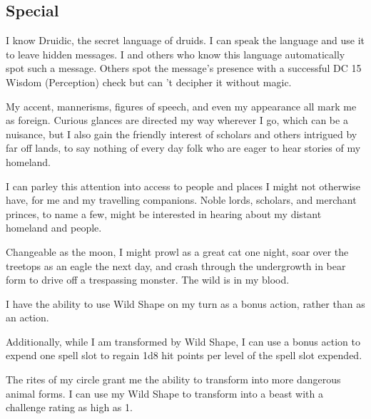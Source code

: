 \documentclass[letterpaper,10pt,twoside,twocolumn,openany]{book}
\begin{document}
\subsection{Special}
\begin{specialability}[Druidic]
  I know Druidic, the secret language of druids. I can speak the language and use it to leave hidden messages. I and others who know this language automatically spot such a message. Others spot the message’s presence with a successful DC 15 Wisdom (Perception) check but can ’t decipher it without magic.
\end{specialability}

\begin{specialability}
  My accent, mannerisms, figures of speech, and even my appearance all mark me as foreign. Curious glances are directed my way wherever I go, which can be a nuisance, but I also gain the friendly interest of scholars and others intrigued by far off lands, to say nothing of every day folk who are eager to hear stories of my homeland.

  I can parley this attention into access to people and places I might not otherwise have, for me and my travelling companions. Noble lords, scholars, and merchant princes, to name a few, might be interested in hearing about my distant homeland and people.
\end{specialability}

\begin{specialability}
  Changeable as the moon, I might prowl as a great cat one night, soar over the treetops as an eagle the next day, and crash through the undergrowth
  in bear form to drive off a trespassing monster. The wild is in my blood.
\end{specialability}

\begin{specialability}
  I have the ability to use Wild Shape on my turn as a bonus action, rather than as an action.

  Additionally, while I am transformed by Wild Shape, I can use a bonus action to expend one spell slot to regain 1d8 hit points per level of the spell slot expended.
\end{specialability}

\begin{specialability}
  The rites of my circle grant me the ability to transform into more dangerous animal forms. I can use my Wild Shape to transform into a beast with a challenge rating as high as 1.
\end{specialability}
\end{document}
